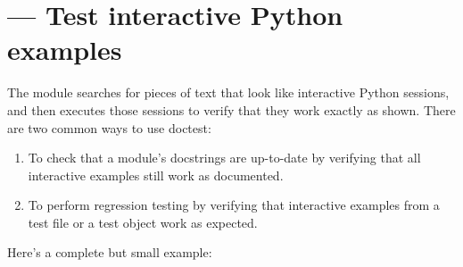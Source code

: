 \section{ ---
         Test interactive Python examples}



The  module searches for pieces of text that look like
interactive Python sessions, and then executes those sessions to
verify that they work exactly as shown.  There are two common ways to
use doctest:

\begin{enumerate}
\item To check that a module's docstrings are up-to-date by verifying
      that all interactive examples still work as documented.
\item To perform regression testing by verifying that interactive
      examples from a test file or a test object work as expected.
\end{enumerate}

Here's a complete but small example:

